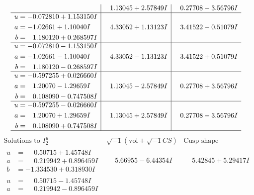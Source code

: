 \documentclass[1p]{elsarticle_modified}
\theoremstyle{definition}
\newcommand{\I}{\sqrt{-1}}
\begin{document}
$$\begin{array}{c|c|c}
 & \phantom{-}1.13045 + 2.57849 I & \phantom{-}0.27708 - 3.56796 I \\ \hline\begin{aligned}
u &= -0.072810 + 1.153150 I \\
a &= -1.02661 + 1.10040 I \\
b &= \phantom{-}1.180120 + 0.268597 I\end{aligned}
 & \phantom{-}4.33052 + 1.13123 I & \phantom{-}3.41522 - 0.51079 I \\ \hline\begin{aligned}
u &= -0.072810 - 1.153150 I \\
a &= -1.02661 - 1.10040 I \\
b &= \phantom{-}1.180120 - 0.268597 I\end{aligned}
 & \phantom{-}4.33052 - 1.13123 I & \phantom{-}3.41522 + 0.51079 I \\ \hline\begin{aligned}
u &= -0.597255 + 0.026660 I \\
a &= \phantom{-}1.20070 - 1.29659 I \\
b &= \phantom{-}0.108090 - 0.747508 I\end{aligned}
 & \phantom{-}1.13045 - 2.57849 I & \phantom{-}0.27708 + 3.56796 I \\ \hline\begin{aligned}
u &= -0.597255 - 0.026660 I \\
a &= \phantom{-}1.20070 + 1.29659 I \\
b &= \phantom{-}0.108090 + 0.747508 I\end{aligned}
 & \phantom{-}1.13045 + 2.57849 I & \phantom{-}0.27708 - 3.56796 I\\
 \hline 
 \end{array}$$\newpage$$\begin{array}{c|c|c}  
\text{Solutions to }I^u_{2}& \I (\text{vol} + \sqrt{-1}CS) & \text{Cusp shape}\\
 \hline 
\begin{aligned}
u &= \phantom{-}0.50715 + 1.45748 I \\
a &= \phantom{-}0.219942 + 0.896459 I \\
b &= -1.334530 + 0.318930 I\end{aligned}
 & \phantom{-}5.66955 - 6.44354 I & \phantom{-}5.42845 + 5.29417 I \\ \hline\begin{aligned}
u &= \phantom{-}0.50715 - 1.45748 I \\
a &= \phantom{-}0.219942 - 0.896459 I \\

\end{aligned}
\end{array}$$
\end{document}
